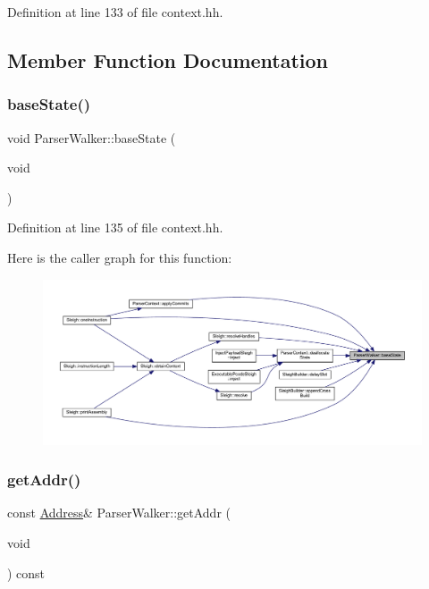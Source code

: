 Definition at line 133 of file context.\+hh.



\subsection{Member Function Documentation}
\mbox{\label{class_parser_walker_a63fb34fd3dee860df4b182351dd935b0}} 
\subsubsection{\texorpdfstring{baseState()}{baseState()}}
{\footnotesize\ttfamily void Parser\+Walker\+::base\+State (\begin{DoxyParamCaption}\item[{void}]{ }\end{DoxyParamCaption})\hspace{0.3cm}{\ttfamily [inline]}}



Definition at line 135 of file context.\+hh.

Here is the caller graph for this function\+:
\nopagebreak
\begin{figure}[H]
\begin{center}
\leavevmode
\includegraphics[width=350pt]{class_parser_walker_a63fb34fd3dee860df4b182351dd935b0_icgraph}
\end{center}
\end{figure}
\mbox{\label{class_parser_walker_a3a5e36992af804c2ece1febb3d0e6691}} 
\subsubsection{\texorpdfstring{getAddr()}{getAddr()}}
{\footnotesize\ttfamily const \mbox{\hyperlink{class_address}{Address}}\& Parser\+Walker\+::get\+Addr (\begin{DoxyParamCaption}\item[{void}]{ }\end{DoxyParamCaption}) const\hspace{0.3cm}{\ttfamily [inline]}}



